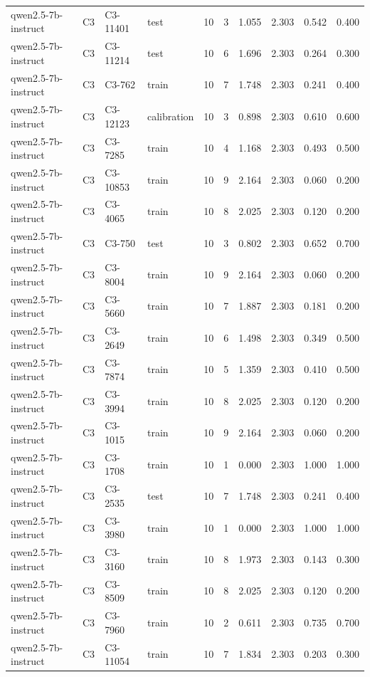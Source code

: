 \begin{table}
\begin{tabular}{llllrrrrrr}
qwen2.5-7b-instruct & C3 & C3-11401 & test & 10 & 3 & 1.055 & 2.303 & 0.542 & 0.400 \\
qwen2.5-7b-instruct & C3 & C3-11214 & test & 10 & 6 & 1.696 & 2.303 & 0.264 & 0.300 \\
qwen2.5-7b-instruct & C3 & C3-762 & train & 10 & 7 & 1.748 & 2.303 & 0.241 & 0.400 \\
qwen2.5-7b-instruct & C3 & C3-12123 & calibration & 10 & 3 & 0.898 & 2.303 & 0.610 & 0.600 \\
qwen2.5-7b-instruct & C3 & C3-7285 & train & 10 & 4 & 1.168 & 2.303 & 0.493 & 0.500 \\
qwen2.5-7b-instruct & C3 & C3-10853 & train & 10 & 9 & 2.164 & 2.303 & 0.060 & 0.200 \\
qwen2.5-7b-instruct & C3 & C3-4065 & train & 10 & 8 & 2.025 & 2.303 & 0.120 & 0.200 \\
qwen2.5-7b-instruct & C3 & C3-750 & test & 10 & 3 & 0.802 & 2.303 & 0.652 & 0.700 \\
qwen2.5-7b-instruct & C3 & C3-8004 & train & 10 & 9 & 2.164 & 2.303 & 0.060 & 0.200 \\
qwen2.5-7b-instruct & C3 & C3-5660 & train & 10 & 7 & 1.887 & 2.303 & 0.181 & 0.200 \\
qwen2.5-7b-instruct & C3 & C3-2649 & train & 10 & 6 & 1.498 & 2.303 & 0.349 & 0.500 \\
qwen2.5-7b-instruct & C3 & C3-7874 & train & 10 & 5 & 1.359 & 2.303 & 0.410 & 0.500 \\
qwen2.5-7b-instruct & C3 & C3-3994 & train & 10 & 8 & 2.025 & 2.303 & 0.120 & 0.200 \\
qwen2.5-7b-instruct & C3 & C3-1015 & train & 10 & 9 & 2.164 & 2.303 & 0.060 & 0.200 \\
qwen2.5-7b-instruct & C3 & C3-1708 & train & 10 & 1 & 0.000 & 2.303 & 1.000 & 1.000 \\
qwen2.5-7b-instruct & C3 & C3-2535 & test & 10 & 7 & 1.748 & 2.303 & 0.241 & 0.400 \\
qwen2.5-7b-instruct & C3 & C3-3980 & train & 10 & 1 & 0.000 & 2.303 & 1.000 & 1.000 \\
qwen2.5-7b-instruct & C3 & C3-3160 & train & 10 & 8 & 1.973 & 2.303 & 0.143 & 0.300 \\
qwen2.5-7b-instruct & C3 & C3-8509 & train & 10 & 8 & 2.025 & 2.303 & 0.120 & 0.200 \\
qwen2.5-7b-instruct & C3 & C3-7960 & train & 10 & 2 & 0.611 & 2.303 & 0.735 & 0.700 \\
qwen2.5-7b-instruct & C3 & C3-11054 & train & 10 & 7 & 1.834 & 2.303 & 0.203 & 0.300 \\

\end{tabular}
\end{table}
